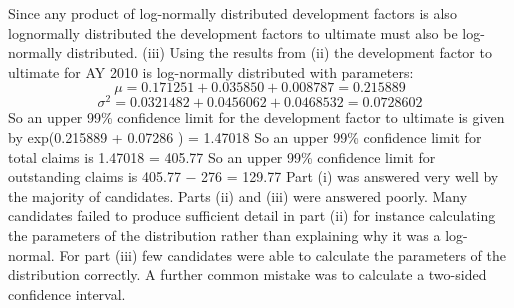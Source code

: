 \documentclass[a4paper,12pt]{article}
\begin{document}
Since any product of log-normally distributed development factors is also lognormally distributed the development factors to ultimate must also be log-
normally distributed.
(iii)
Using the results from (ii) the development factor to ultimate for AY 2010 is
log-normally distributed with parameters:
\[\mu  = 0.171251 + 0.035850 + 0.008787 = 0.215889\]
\[\sigma^{2} = 0.0321482 + 0.0456062 + 0.0468532 = 0.0728602\]
So an upper 99\% confidence limit for the development factor to ultimate is given by exp(0.215889 + 0.07286 ) = 1.47018
So an upper 99\% confidence limit for total claims is
1.47018  = 405.77
So an upper 99\% confidence limit for outstanding claims is
405.77 − 276 = 129.77
\newpage
Part (i) was answered very well by the majority of candidates. Parts (ii) and (iii) were answered poorly. Many candidates failed to produce sufficient detail in part (ii) for instance calculating the parameters of the distribution rather than explaining why it was a log-normal. For part (iii) few candidates were able to calculate the parameters
of the distribution correctly. A further common mistake was to calculate a two-sided confidence interval.
\end{document}
